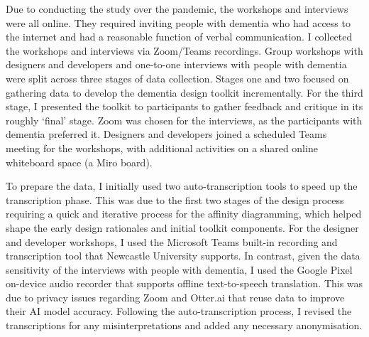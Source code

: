 Due to conducting the study over the pandemic, the workshops and interviews were all online. They required inviting people with dementia who had access to the internet and had a reasonable function of verbal communication. I collected the workshops and interviews via Zoom/Teams recordings. Group workshops with designers and developers and one-to-one interviews with people with dementia were split across three stages of data collection. Stages one and two focused on gathering data to develop the dementia design toolkit incrementally. For the third stage, I presented the toolkit to participants to gather feedback and critique in its roughly `final' stage. Zoom was chosen for the interviews, as the participants with dementia preferred it. Designers and developers joined a scheduled Teams meeting for the workshops, with additional activities on a shared online whiteboard space (a Miro board).

To prepare the data, I initially used two auto-transcription tools to speed up the transcription phase. This was due to the first two stages of the design process requiring a quick and iterative process for the affinity diagramming, which helped shape the early design rationales and initial toolkit components. For the designer and developer workshops, I used the Microsoft Teams built-in recording and transcription tool that Newcastle University supports. In contrast, given the data sensitivity of the interviews with people with dementia, I used the Google Pixel on-device audio recorder that supports offline text-to-speech translation. This was due to privacy issues regarding Zoom and Otter.ai that reuse data to improve their AI model accuracy. Following the auto-transcription process, I revised the transcriptions for any misinterpretations and added any necessary anonymisation. 

